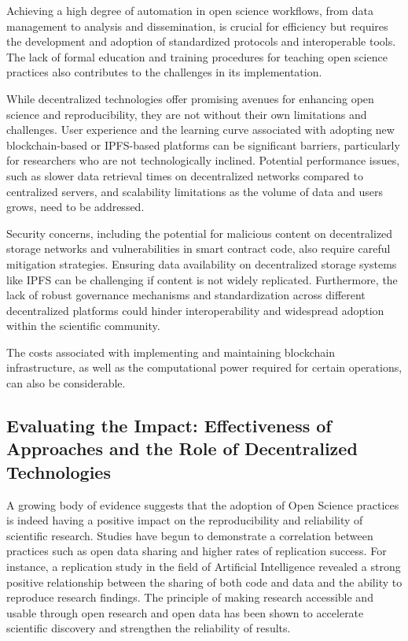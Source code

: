 \documentclass{article}
\begin{document}
Achieving a high degree of automation in open science workflows, from data management to analysis and dissemination, is crucial for efficiency but requires the development and adoption of standardized protocols and interoperable tools. The lack of formal education and training procedures for teaching open science practices also contributes to the challenges in its implementation.

While decentralized technologies offer promising avenues for enhancing open science and reproducibility, they are not without their own limitations and challenges. User experience and the learning curve associated with adopting new blockchain-based or IPFS-based platforms can be significant barriers, particularly for researchers who are not technologically inclined. Potential performance issues, such as slower data retrieval times on decentralized networks compared to centralized servers, and scalability limitations as the volume of data and users grows, need to be addressed.

Security concerns, including the potential for malicious content on decentralized storage networks and vulnerabilities in smart contract code, also require careful mitigation strategies. Ensuring data availability on decentralized storage systems like IPFS can be challenging if content is not widely replicated. Furthermore, the lack of robust governance mechanisms and standardization across different decentralized platforms could hinder interoperability and widespread adoption within the scientific community.

The costs associated with implementing and maintaining blockchain infrastructure, as well as the computational power required for certain operations, can also be considerable.

\subsection{Evaluating the Impact: Effectiveness of Approaches and the Role of Decentralized Technologies}

A growing body of evidence suggests that the adoption of Open Science practices is indeed having a positive impact on the reproducibility and reliability of scientific research. Studies have begun to demonstrate a correlation between practices such as open data sharing and higher rates of replication success. For instance, a replication study in the field of Artificial Intelligence revealed a strong positive relationship between the sharing of both code and data and the ability to reproduce research findings. The principle of making research accessible and usable through open research and open data has been shown to accelerate scientific discovery and strengthen the reliability of results.
\end{document}
